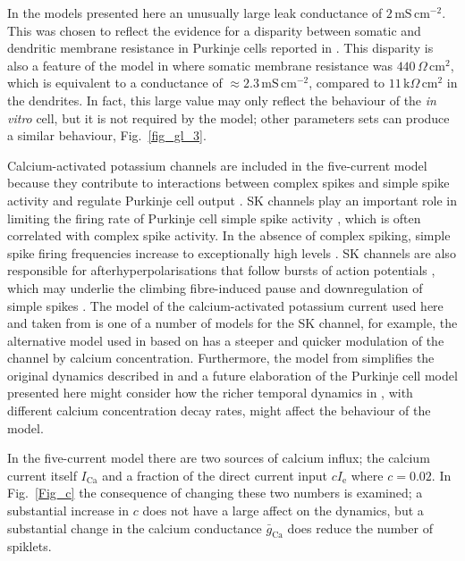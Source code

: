 \documentclass[twocolumn]{svjour3}          %
\newcommand{\msi}{\,\mathrm{mS\,cm^{-2}}}
\newcommand{\ca}{\mathrm{Ca}}
\begin{document}
In the models presented here an unusually large leak conductance of
$2\msi$. This was chosen to reflect the evidence for a disparity
between somatic and dendritic membrane resistance in Purkinje cells
reported in \citet{RappEtAl1994}. This disparity is also a feature of
the model in
\citet{DeSchutterBower1994a,DeSchutterBower1994b,DeSchutterBower1994c}
where somatic membrane resistance was $440\,\Omega\,\mathrm{cm}^2$,
which is equivalent to a conductance of $\approx 2.3\msi$, compared to
$11\,\mathrm{k}\Omega\,\mathrm{cm}^2$ in the dendrites. In fact, this
large value may only reflect the behaviour of the \textsl{in vitro}
cell, but it is not required by the model; other parameters sets can
produce a similar behaviour, Fig.~\ref{fig_gl_3}.

Calcium-activated potassium channels are included in the five-current
model because they contribute to interactions between complex spikes
and simple spike activity and regulate Purkinje cell output
\citep{TankEtAl1988,McKayEtAl2007}. SK channels play an important role
in limiting the firing rate of Purkinje cell simple spike activity
\citep{WomackEtAl2003,EgorovaEtAl2014}, which is often
correlated with complex spike activity. In the absence of complex
spiking, simple spike firing frequencies increase to exceptionally
high levels \citep{CerminaraRawson2004}. SK channels are also
responsible for afterhyperpolarisations that follow bursts of action
potentials \citep{HosyEtAl2011}, which may underlie the climbing
fibre-induced pause and downregulation of simple spikes
\citep{Xian-HuaEtAl2017}. The model of the calcium-activated potassium
current used here and taken from \citet{GilliesWillshaw2006} is one of
a number of models for the SK channel, for example, the alternative
model used in \citet{GriffithEtAl2016} based on
\citet{ChayKeizer1983,XiaEtAl1998} has a steeper and quicker modulation
of the channel by calcium concentration. Furthermore, the model from
\citet{GilliesWillshaw2006} simplifies the original dynamics described
in \citet{HirschbergEtAl1998} and a future elaboration of the Purkinje
cell model presented here might consider how the richer temporal
dynamics in \citet{HirschbergEtAl1998}, with different calcium
concentration decay rates, might affect the behaviour of the model.

In the five-current model there are two sources of calcium influx; the
calcium current itself $I_\ca$ and a fraction of the direct current
input $cI_{\mathrm{e}}$ where $c=0.02$. In Fig.~\ref{Fig_c} the
consequence of changing these two numbers is examined; a substantial
increase in $c$ does not have a large affect on the dynamics, but a
substantial change in the calcium conductance $\bar{g}_\ca$ does
reduce the number of spiklets.
\end{document}
